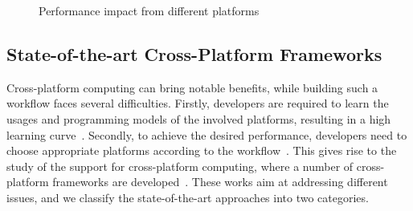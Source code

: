 \begin{figure}
  \centering
  
  \caption{Performance impact from different platforms}
  \label{fig:hetero}
\end{figure}




\subsection{State-of-the-art Cross-Platform Frameworks}

Cross-platform computing can bring notable benefits, while building such a workflow faces several difficulties. Firstly, developers are required to learn the usages and programming models of the involved platforms, resulting in a high learning curve~\cite{gadepally2016bigdawg}. Secondly, to achieve the desired performance, developers need to choose appropriate platforms according to the workflow~\cite{agrawal2016rheem,hutchison2017laradb,gog2015musketeer}.
This gives rise to the study of the support for cross-platform computing, where a number of cross-platform frameworks are developed~\cite{tsoumakos2013case, tan2017enabling, lu2019multi,gittens2018accelerating}.
These works aim at addressing different issues, and we classify the state-of-the-art approaches into two categories.

